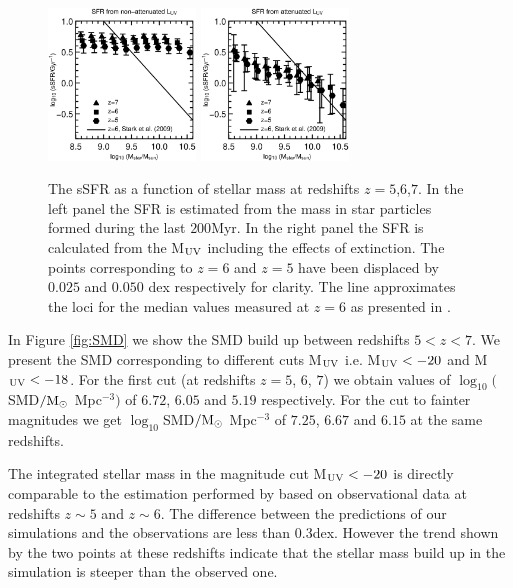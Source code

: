 \documentclass{emulateapj}
\newcommand{\Msun}{{\ifmmode{{\rm {M_{\odot}}}}\else{${\rm{M_{\odot}}}$}\fi}}
\begin{document}
\begin{figure}
\begin{center}
\includegraphics[width=0.35\textwidth]{./ssfr_no_ext_mstar_z.ps}\hspace{0.5cm}
\includegraphics[width=0.35\textwidth]{./ssfr_ext_mstar_z.ps}
\end{center}
\caption{The sSFR  as a function of stellar
  mass at redshifts $z=5$,$6$,$7$. In the left panel the SFR is
  estimated from the mass in star particles formed
  during the last $200$Myr. In the right panel the SFR is calculated from the
  M$_{\rm UV}$ including the effects of extinction. The
  points corresponding to $z=6$ and $z=5$ have been displaced by
  $0.025$ and $0.050$ dex respectively for clarity. The line
  approximates the loci for the median values measured at $z=6$
  \citep{2009ApJ...697.1493S} as presented in \citet{2011MNRAS.410L..42K}. 
}
\label{fig:sSFR}
\end{figure}

In Figure \ref{fig:SMD} we show the SMD build up between redshifts
$5<z<7$. We present the SMD corresponding to different cuts M$_{{\rm UV}}$ i.e. M$_{{\rm UV}}<-20$ and M$_{\rm UV}<-18$.  For the first cut (at redshifts $z=5$, $6$, $7$) we obtain values of $\log_{10}($SMD$/\Msun$ Mpc$^{-3})$ of $6.72$, $6.05$ and $5.19$ respectively. For the cut to fainter magnitudes we get $\log_{10}$SMD$/\Msun$ Mpc$^{-3}$ of $7.25$, $6.67$ and $6.15$ at the same redshifts.

The integrated stellar mass
in the magnitude cut M$_{\rm UV}<-20$ is directly comparable to the  estimation
performed by \citet{2009ApJ...697.1493S} based on observational data at
redshifts $z\sim 5$ and $z\sim 6$. The difference between the predictions
of our simulations and the observations are less than 0.3dex. However
the trend shown by the two points at these redshifts indicate that the
stellar mass build up in the simulation is steeper than the observed one.
\end{document}
